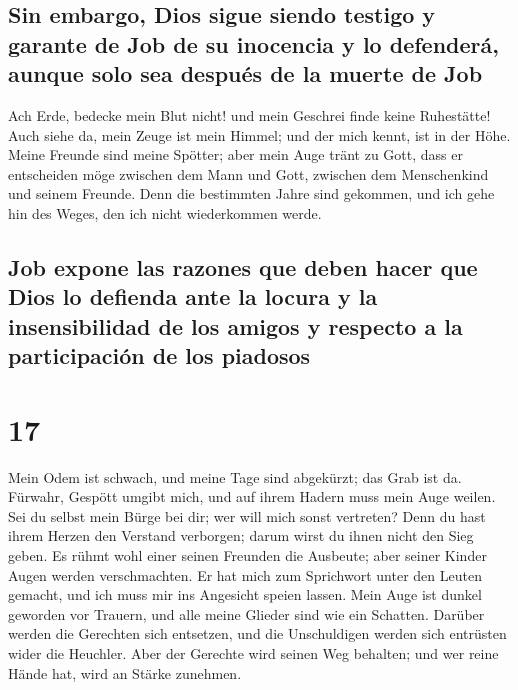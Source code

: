 \hypertarget{sin-embargo-dios-sigue-siendo-testigo-y-garante-de-job-de-su-inocencia-y-lo-defenderuxe1-aunque-solo-sea-despuuxe9s-de-la-muerte-de-job}{%
\subsection{Sin embargo, Dios sigue siendo testigo y garante de Job de
su inocencia y lo defenderá, aunque solo sea después de la muerte de
Job}\label{sin-embargo-dios-sigue-siendo-testigo-y-garante-de-job-de-su-inocencia-y-lo-defenderuxe1-aunque-solo-sea-despuuxe9s-de-la-muerte-de-job}}

 Ach Erde, bedecke mein Blut nicht! und mein Geschrei
finde keine Ruhestätte!  Auch siehe da, mein Zeuge ist
mein Himmel; und der mich kennt, ist in der Höhe.  Meine
Freunde sind meine Spötter; aber mein Auge tränt zu Gott,
 dass er entscheiden möge zwischen dem Mann und Gott,
zwischen dem Menschenkind und seinem Freunde.  Denn die
bestimmten Jahre sind gekommen, und ich gehe hin des Weges, den ich
nicht wiederkommen werde.

\hypertarget{job-expone-las-razones-que-deben-hacer-que-dios-lo-defienda-ante-la-locura-y-la-insensibilidad-de-los-amigos-y-respecto-a-la-participaciuxf3n-de-los-piadosos}{%
\subsection{Job expone las razones que deben hacer que Dios lo defienda
ante la locura y la insensibilidad de los amigos y respecto a la
participación de los
piadosos}\label{job-expone-las-razones-que-deben-hacer-que-dios-lo-defienda-ante-la-locura-y-la-insensibilidad-de-los-amigos-y-respecto-a-la-participaciuxf3n-de-los-piadosos}}

\hypertarget{section-16}{%
\section{17}\label{section-16}}

 Mein Odem ist schwach, und meine Tage sind abgekürzt; das
Grab ist da.  Fürwahr, Gespött umgibt mich, und auf ihrem
Hadern muss mein Auge weilen.  Sei du selbst mein Bürge
bei dir; wer will mich sonst vertreten?  Denn du hast
ihrem Herzen den Verstand verborgen; darum wirst du ihnen nicht den Sieg
geben.  Es rühmt wohl einer seinen Freunden die Ausbeute;
aber seiner Kinder Augen werden verschmachten.  Er hat
mich zum Sprichwort unter den Leuten gemacht, und ich muss mir ins
Angesicht speien lassen.  Mein Auge ist dunkel geworden
vor Trauern, und alle meine Glieder sind wie ein Schatten.
 Darüber werden die Gerechten sich entsetzen, und die
Unschuldigen werden sich entrüsten wider die Heuchler. 
Aber der Gerechte wird seinen Weg behalten; und wer reine Hände hat,
wird an Stärke zunehmen.

